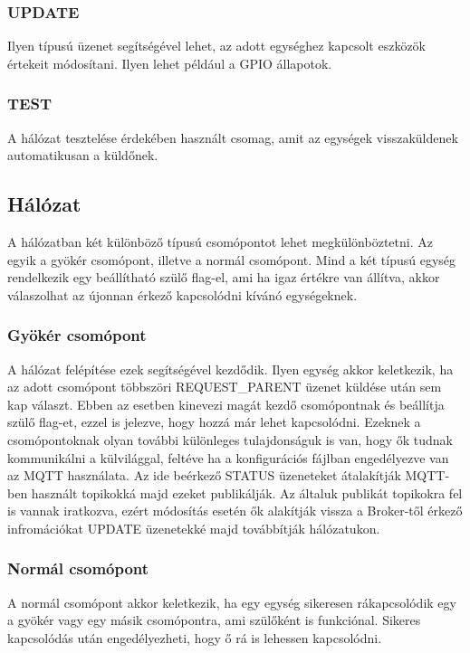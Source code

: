 \subsubsection{UPDATE}
Ilyen típusú üzenet segítségével lehet, az adott egységhez kapcsolt eszközök értekeit módosítani. Ilyen lehet például a GPIO állapotok.
\subsubsection{TEST}
A hálózat tesztelése érdekében használt csomag, amit az egységek visszaküldenek automatikusan a küldőnek.


\subsection{Hálózat}
A hálózatban két különböző típusú csomópontot lehet megkülönböztetni. Az egyik a gyökér csomópont, illetve a normál csomópont. Mind a két típusú egység rendelkezik egy beállítható szülő flag-el, ami ha igaz értékre van állítva, akkor válaszolhat az újonnan érkező kapcsolódni kívánó egységeknek.

\subsubsection{Gyökér csomópont}
A hálózat felépítése ezek segítségével kezdődik. Ilyen egység akkor keletkezik, ha az adott csomópont többszöri REQUEST\_PARENT üzenet küldése után sem kap választ. Ebben az esetben kinevezi magát kezdő csomópontnak és beállítja szülő flag-et, ezzel is jelezve, hogy hozzá már lehet kapcsolódni. Ezeknek a csomópontoknak olyan további különleges tulajdonságuk is van, hogy ők tudnak kommunikálni a külvilággal, feltéve ha a konfigurációs fájlban engedélyezve van az MQTT használata. Az ide beérkező STATUS üzeneteket átalakítják MQTT-ben használt topikokká majd ezeket publikálják. Az általuk publikát topikokra fel is vannak iratkozva, ezért módosítás esetén ők alakítják vissza a Broker-től érkező infromációkat UPDATE üzenetekké majd továbbítják hálózatukon.

\subsubsection{Normál csomópont}
A normál csomópont akkor keletkezik, ha egy egység sikeresen rákapcsolódik egy a gyökér vagy egy másik csomópontra, ami szülőként is funkciónal. Sikeres kapcsolódás után engedélyezheti, hogy ő rá is lehessen kapcsolódni.

